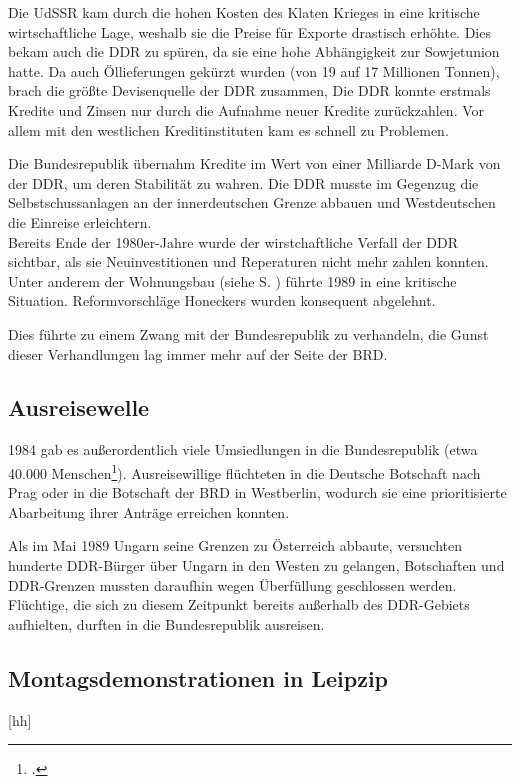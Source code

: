 \documentclass[12pt,a4paper]{article}
\begin{document}
Die UdSSR kam durch die hohen Kosten des Klaten Krieges in eine kritische wirtschaftliche Lage, weshalb sie die Preise für Exporte drastisch erhöhte. Dies bekam auch die DDR zu spüren, da sie eine hohe Abhängigkeit zur Sowjetunion hatte.
Da auch Öllieferungen gekürzt wurden (von 19 auf 17 Millionen Tonnen), brach die größte Devisenquelle der DDR zusammen, Die DDR konnte erstmals Kredite und Zinsen nur durch die Aufnahme neuer Kredite zurückzahlen. Vor allem mit den westlichen Kreditinstituten kam es schnell zu Problemen.

Die Bundesrepublik übernahm Kredite im Wert von einer Milliarde D-Mark von der DDR, um deren Stabilität zu wahren.
Die DDR musste im Gegenzug die Selbstschussanlagen an der innerdeutschen Grenze abbauen und Westdeutschen die Einreise erleichtern. \\

Bereits Ende der 1980er-Jahre wurde der wirstchaftliche Verfall der DDR sichtbar, als sie Neuinvestitionen und Reperaturen nicht mehr zahlen konnten. Unter anderem der Wohnungsbau (siehe S. \pageref{sub:wohnung}) führte 1989 in eine kritische Situation. 
Reformvorschläge Honeckers wurden konsequent abgelehnt.

Dies führte zu einem Zwang mit der Bundesrepublik zu verhandeln, die Gunst dieser Verhandlungen lag immer mehr auf der Seite der BRD.


\subsection{Ausreisewelle}
\label{ausreise}

1984 gab es außerordentlich viele Umsiedlungen in die Bundesrepublik (etwa 40.000 Menschen\footcite{wiki:geschddr}). Ausreisewillige flüchteten in die Deutsche Botschaft nach Prag oder in die Botschaft der BRD in Westberlin, wodurch sie eine prioritisierte Abarbeitung ihrer Anträge erreichen konnten.

Als im Mai 1989 Ungarn seine Grenzen zu Österreich abbaute, versuchten hunderte DDR-Bürger über Ungarn in den Westen zu gelangen, Botschaften und DDR-Grenzen mussten daraufhin wegen Überfüllung geschlossen werden.
Flüchtige, die sich zu diesem Zeitpunkt bereits außerhalb des DDR-Gebiets aufhielten, durften in die Bundesrepublik ausreisen.


\subsection{Montagsdemonstrationen in Leipzip}[hh]
\end{document}
